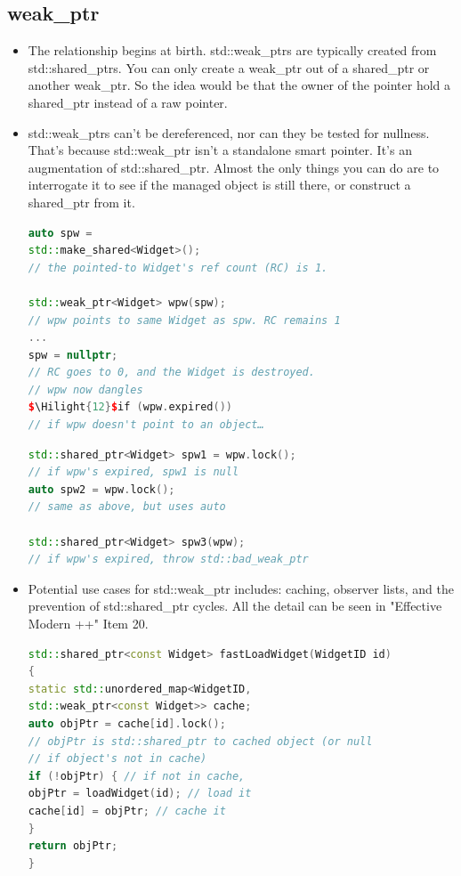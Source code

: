 \documentclass[a4paper,12pt,twoside]{book}
\newcommand{\Hilight}[1]{\makebox[0pt][l]{\color{yellow}\rule[-3pt]{#1em}{11pt}}}
\begin{document}
\subsection{weak\_ptr}
\begin{itemize}

\item The relationship begins at birth. std::weak\_ptrs are typically created from std::shared\_ptrs. You can only create a weak\_ptr out of a shared\_ptr or another weak\_ptr. So the idea would be that the owner of the pointer hold a shared\_ptr instead of a raw pointer.


\item std::weak\_ptrs can't be dereferenced, nor can they be tested for nullness. That's because std::weak\_ptr isn't a standalone smart pointer. It's an augmentation of std::shared\_ptr. Almost the only things you can do are to interrogate it to see if the managed object is still there, or construct a shared\_ptr from it.

\begin{lstlisting}[frame=single, language=c++,mathescape=true]
auto spw =
std::make_shared<Widget>();
// the pointed-to Widget's ref count (RC) is 1.

std::weak_ptr<Widget> wpw(spw);
// wpw points to same Widget as spw. RC remains 1
...
spw = nullptr;
// RC goes to 0, and the Widget is destroyed.
// wpw now dangles
$\Hilight{12}$if (wpw.expired())
// if wpw doesn't point to an object…
\end{lstlisting}

\begin{lstlisting}[frame=single, language=c++,mathescape=true]
std::shared_ptr<Widget> spw1 = wpw.lock();
// if wpw's expired, spw1 is null
auto spw2 = wpw.lock();
// same as above, but uses auto

std::shared_ptr<Widget> spw3(wpw);
// if wpw's expired, throw std::bad_weak_ptr
\end{lstlisting}


\item Potential use cases for std::weak\_ptr includes: caching, observer lists, and the prevention of std::shared\_ptr cycles.  All the detail can be seen in "Effective Modern ++" Item 20.
\begin{lstlisting}[frame=single, language=c++]
std::shared_ptr<const Widget> fastLoadWidget(WidgetID id)
{
static std::unordered_map<WidgetID,
std::weak_ptr<const Widget>> cache;
auto objPtr = cache[id].lock();
// objPtr is std::shared_ptr to cached object (or null
// if object's not in cache)
if (!objPtr) { // if not in cache,
objPtr = loadWidget(id); // load it
cache[id] = objPtr; // cache it
}
return objPtr;
}
\end{lstlisting}


\end{itemize}
\end{document}
